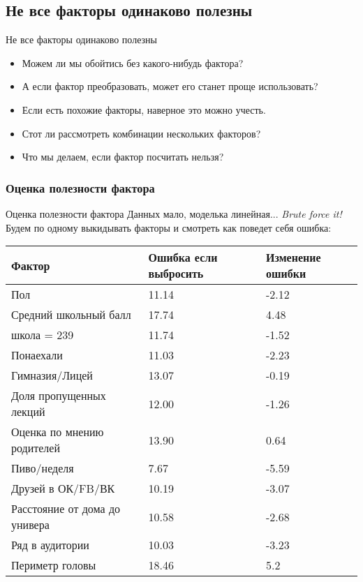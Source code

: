 \documentclass[14pt, fleqn, xcolor={dvipsnames, table}, hyperref={unicode}, babel={english,russian}, inputenc=utf8x]{beamer}
\begin{document}
\subsection{Не все факторы одинаково полезны}
\begin{frame}{Не все факторы одинаково полезны}
\begin{itemize}
  \item Можем ли мы обойтись без какого-нибудь фактора?
  \item А если фактор преобразовать, может его станет проще использовать?
  \item Если есть похожие факторы, наверное это можно учесть.
  \item Стот ли рассмотреть комбинации нескольких факторов?
  \item Что мы делаем, если фактор посчитать нельзя?
\end{itemize}
\end{frame}

\subsubsection{Оценка полезности фактора}
\begin{frame}{Оценка полезности фактора}
Данных мало, моделька линейная... {\em Brute force it!}
Будем по одному выкидывать факторы и смотреть как поведет себя ошибка:
\footnotesize
\begin{tabular}{l|l|l}
Фактор & \multicolumn{1}{p{5em}|}{Ошибка если выбросить} & Изменение ошибки \\
\hline
Пол & 11.14 & -2.12 \\
Средний школьный балл & 17.74 & 4.48 \\
школа = 239 & 11.74 & -1.52 \\
Понаехали & 11.03 & -2.23 \\
Гимназия/Лицей & 13.07 & -0.19 \\
Доля пропущенных лекций & 12.00 & -1.26 \\
Оценка по мнению родителей & 13.90 & 0.64 \\
Пиво/неделя & 7.67 & -5.59 \\
Друзей в ОК/FB/ВК & 10.19 & -3.07 \\
Расстояние от дома до универа & 10.58 & -2.68 \\
Ряд в аудитории & 10.03 & -3.23 \\
Периметр головы & 18.46 & 5.2 \\
\end{tabular}
\end{frame}
\end{document}
